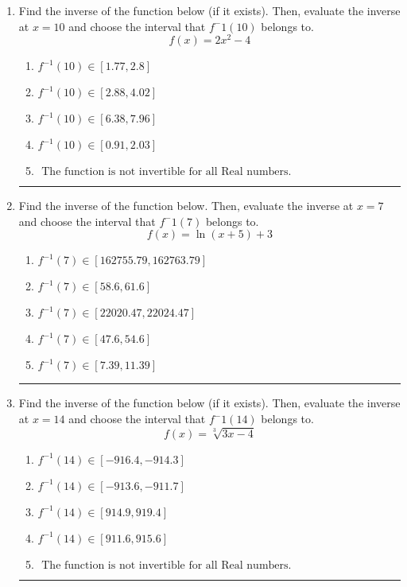 \documentclass[14pt]{extbook}
\newcommand{\litem}[1]{\item#1\hspace*{-1cm}\rule{\textwidth}{0.4pt}}
\begin{document}
\begin{enumerate}
{\begin{enumerate}[label=\Alph*.]
\end{enumerate} }
\litem{
Find the inverse of the function below (if it exists). Then, evaluate the inverse at $x = 10$ and choose the interval that $f^-1(10)$ belongs to.\[ f(x) = 2 x^2 - 4 \]\begin{enumerate}[label=\Alph*.]
\item \( f^{-1}(10) \in [1.77, 2.8] \)
\item \( f^{-1}(10) \in [2.88, 4.02] \)
\item \( f^{-1}(10) \in [6.38, 7.96] \)
\item \( f^{-1}(10) \in [0.91, 2.03] \)
\item \( \text{ The function is not invertible for all Real numbers. } \)

\end{enumerate} }
\litem{
Find the inverse of the function below. Then, evaluate the inverse at $x = 7$ and choose the interval that $f^-1(7)$ belongs to.\[ f(x) = \ln{(x+5)}+3 \]\begin{enumerate}[label=\Alph*.]
\item \( f^{-1}(7) \in [162755.79, 162763.79] \)
\item \( f^{-1}(7) \in [58.6, 61.6] \)
\item \( f^{-1}(7) \in [22020.47, 22024.47] \)
\item \( f^{-1}(7) \in [47.6, 54.6] \)
\item \( f^{-1}(7) \in [7.39, 11.39] \)

\end{enumerate} }
\litem{
Find the inverse of the function below (if it exists). Then, evaluate the inverse at $x = 14$ and choose the interval that $f^-1(14)$ belongs to.\[ f(x) = \sqrt[3]{3 x - 4} \]\begin{enumerate}[label=\Alph*.]
\item \( f^{-1}(14) \in [-916.4, -914.3] \)
\item \( f^{-1}(14) \in [-913.6, -911.7] \)
\item \( f^{-1}(14) \in [914.9, 919.4] \)
\item \( f^{-1}(14) \in [911.6, 915.6] \)
\item \( \text{ The function is not invertible for all Real numbers. } \)


\end{enumerate}}
\end{enumerate}
\end{document}
